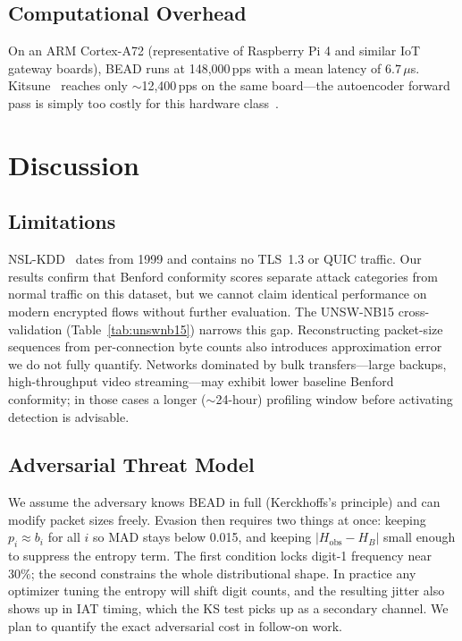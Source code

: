 \documentclass[conference]{IEEEtran}
\begin{document}
\subsection{Computational Overhead}

On an ARM Cortex-A72 (representative of Raspberry Pi 4 and similar IoT
gateway boards), BEAD runs at 148,000\,pps with a mean latency of
$6.7\,\mu$s. Kitsune~\cite{b14} reaches only $\sim$12,400\,pps on the
same board—the autoencoder forward pass is simply too costly for this
hardware class~\cite{b15}.

\section{Discussion}

\subsection{Limitations}
\label{sec:limits}

NSL-KDD~\cite{b9} dates from 1999 and contains no TLS~1.3 or QUIC
traffic. Our results confirm that Benford conformity scores separate
attack categories from normal traffic on this dataset, but we cannot
claim identical performance on modern encrypted flows without further
evaluation. The UNSW-NB15 cross-validation (Table~\ref{tab:unswnb15})
narrows this gap. Reconstructing packet-size sequences from per-connection
byte counts also introduces approximation error we do not fully quantify.
Networks dominated by bulk transfers—large backups, high-throughput video
streaming—may exhibit lower baseline Benford conformity; in those cases
a longer ($\sim$24-hour) profiling window before activating detection is
advisable.

\subsection{Adversarial Threat Model}

We assume the adversary knows BEAD in full (Kerckhoffs's principle) and
can modify packet sizes freely. Evasion then requires two things at once:
keeping $p_i \approx b_i$ for all $i$ so MAD stays below 0.015, and
keeping $|H_{\text{obs}} - H_B|$ small enough to suppress the entropy
term. The first condition locks digit-1 frequency near 30\%; the second
constrains the whole distributional shape. In practice any optimizer
tuning the entropy will shift digit counts, and the resulting jitter
also shows up in IAT timing, which the KS test picks up as a secondary
channel. We plan to quantify the exact adversarial cost in follow-on work.
\end{document}
